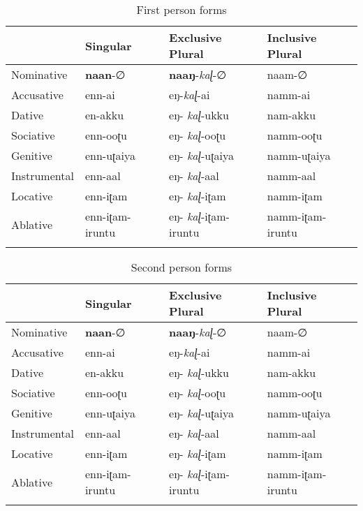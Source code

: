 \documentclass[output=paper]{langscibook}
\begin{document}
\begin{table}
    \begin{tabular}{llll}
    \lsptoprule
                 & Singular        & Exclusive Plural      & Inclusive Plural \\\midrule
    Nominative   & \textbf{naan}-∅          & \textbf{naaŋ}-\textit{kaɭ}-∅            & naam-∅           \\
    Accusative   & enn-ai          & eŋ-\textit{kaɭ}-ai             & namm-ai          \\
    Dative       & en-akku         & eŋ-   \textit{kaɭ}-ukku        & nam-akku         \\
    Sociative    & enn-ooʈu        & eŋ-   \textit{kaɭ}-ooʈu        & namm-ooʈu        \\
    Genitive     & enn-uʈaiya      & eŋ-   \textit{kaɭ}-uʈaiya      & namm-uʈaiya      \\
    Instrumental & enn-aal         & eŋ-   \textit{kaɭ}-aal         & namm-aal         \\
    Locative     & enn-iʈam        & eŋ-   \textit{kaɭ}-iʈam        & namm-iʈam        \\
    Ablative     & enn-iʈam-iruntu & eŋ-   \textit{kaɭ}-iʈam-iruntu & namm-iʈam-iruntu \\\lspbottomrule
    \end{tabular}
    \caption{First person forms \citep{steever2019dravidian}}
    \label{new2a}
\end{table}

\begin{table}
    \begin{tabular}{llll}
    \lsptoprule
                 & Singular        & Exclusive Plural      & Inclusive Plural \\\midrule
    Nominative   & \textbf{naan}-∅          & \textbf{naaŋ}-\textit{kaɭ}-∅            & naam-∅           \\
    Accusative   & enn-ai          & eŋ-\textit{kaɭ}-ai             & namm-ai          \\
    Dative       & en-akku         & eŋ-   \textit{kaɭ}-ukku        & nam-akku         \\
    Sociative    & enn-ooʈu        & eŋ-   \textit{kaɭ}-ooʈu        & namm-ooʈu        \\
    Genitive     & enn-uʈaiya      & eŋ-   \textit{kaɭ}-uʈaiya      & namm-uʈaiya      \\
    Instrumental & enn-aal         & eŋ-   \textit{kaɭ}-aal         & namm-aal         \\
    Locative     & enn-iʈam        & eŋ-   \textit{kaɭ}-iʈam        & namm-iʈam        \\
    Ablative     & enn-iʈam-iruntu & eŋ-   \textit{kaɭ}-iʈam-iruntu & namm-iʈam-iruntu\\\lspbottomrule
    \end{tabular}
    \caption{Second person forms \citep{steever2019dravidian}\label{new2b}}
\end{table}
\end{document}
